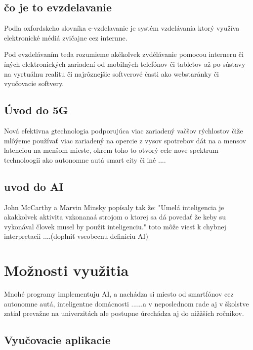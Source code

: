\documentclass[10pt,oneside,sloak,a4paper]{article}
\begin{document}

\subsection{čo je to evzdelavanie}
Podla oxfordskeho slovníka e-vzdelavanie je systém vzdelávania ktorý využíva elektronické médiá zvičajne cez internne. 

Pod evzdelávaním teda rozumieme akékolvek zvdélávanie pomocou interneru či íných elektronických zariadení od mobilných telefónov či tabletov až po sústavy na vyrtuálnu realitu či najrôznejšie softverové časti ako webstaránky či vyučovacie softvery. 
\subsection{Úvod do 5G}
Nová efektivna gtechnologia podporujúca viac zariadený vačšov rýchlostov čiže mlôýeme používať viac zariadený na opercie z vysov spotrebov dát na a mensov latenciou na menšom mieste, okrem toho to otvorý cele nove spektrum technoloogii ako autonomne autá smart city či iné ....
\subsection{uvod do AI}
John McCarthy a Marvin Minsky popísaly tak že: "Umelá inteligencia je akakkolvek aktivita vzkonanaá strojom o ktorej sa dá povedať že keby su vykonával človek musel by použit inteligenciu." toto môže viesť k chybnej interpretacii ....(doplniť vseobecnu definiciu AI)


\section{Možnosti využitia} 
Mnohé programy implementuju AI, a nachádza si miesto od smartfónov cez autonomne autá, inteligentne domácnosti ......a v neposlednom rade aj v školstve zatial prevažne na univerzitách ale postupne úrechádza aj do nižžších ročnikov.  

\subsection{Vyučovacie aplikacie}
\end{document}
